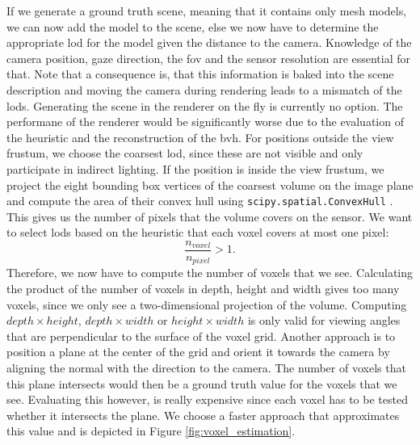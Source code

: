 If we generate a ground truth scene, meaning that it contains only mesh models, we can now add the model to the scene, else we now have to determine the appropriate \ac{lod} for the model given the distance to the camera.
Knowledge of the camera position, gaze direction, the \ac{fov} and the sensor resolution are essential for that.
Note that a consequence is, that this information is baked into the scene description and moving the camera during rendering leads to a mismatch of the \acp{lod}.
Generating the scene in the renderer on the fly is currently no option.
The performane of the renderer would be significantly worse due to the evaluation of the heuristic and the reconstruction of the \ac{bvh}.
For positions outside the view frustum, we choose the coarsest \ac{lod}, since these are not visible and only participate in indirect lighting.
If the position is inside the view frustum, we project the eight bounding box vertices of the coarsest volume on the image plane and compute the area of their convex hull using \texttt{scipy.spatial.ConvexHull} \cite{scipy}.
This gives us the number of pixels that the volume covers on the sensor.
We want to select \acp{lod} based on the heuristic that each voxel covers at most one pixel:
\begin{equation*}
    \frac{n_{voxel}}{n_{pixel}} > 1.
\end{equation*}
Therefore, we now have to compute the number of voxels that we see.
Calculating the product of the number of voxels in depth, height and width gives too many voxels, since we only see a two-dimensional projection of the volume.
Computing $depth \times height$, $depth \times width$ or $height \times width$ is only valid for viewing angles that are perpendicular to the surface of the voxel grid.
Another approach is to position a plane at the center of the grid and orient it towards the camera by aligning the normal with the direction to the camera.
The number of voxels that this plane intersects would then be a ground truth value for the voxels that we see.
Evaluating this however, is really expensive since each voxel has to be tested whether it intersects the plane.
We choose a faster approach that approximates this value and is depicted in Figure \ref{fig:voxel_estimation}.

